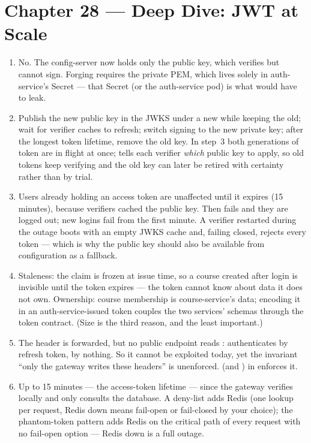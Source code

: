 \section*{Chapter 28 --- Deep Dive: JWT at Scale}
\begin{enumerate}
  \item No. The config-server now holds only the public key, which
  verifies but cannot sign. Forging requires the private PEM, which
  lives solely in auth-service's Secret --- that Secret (or the
  auth-service pod) is what would have to leak.
  \item Publish the new public key in the JWKS under a new 
  while keeping the old; wait for verifier caches to refresh; switch
  signing to the new private key; after the longest token lifetime,
  remove the old key. In step~3 both generations of token are in
  flight at once;  tells each verifier \emph{which} public
  key to apply, so old tokens keep verifying and the old key can later
  be retired with certainty rather than by trial.
  \item Users already holding an access token are unaffected until it
  expires (15 minutes), because verifiers cached the public key. Then
   fails and they are logged out; new logins fail from
  the first minute. A verifier restarted during the outage boots with
  an empty JWKS cache and, failing closed, rejects every token ---
  which is why the public key should also be available from
  configuration as a fallback.
  \item Staleness: the claim is frozen at issue time, so a course
  created after login is invisible until the token expires --- the
  token cannot know about data it does not own. Ownership: course
  membership is course-service's data; encoding it in an
  auth-service-issued token couples the two services' schemas through
  the token contract. (Size is the third reason, and the least
  important.)
  \item The header is forwarded, but no public endpoint reads
  :  authenticates by refresh token,
   by nothing. So it cannot be exploited today, yet
  the invariant ``only the gateway writes these headers'' is
  unenforced. 
  (and ) in  enforces it.
  \item Up to 15 minutes --- the access-token lifetime --- since the
  gateway verifies locally and only  consults the
  database. A  deny-list adds Redis (one lookup per request,
  Redis down means fail-open or fail-closed by your choice); the
  phantom-token pattern adds Redis on the critical path of every
  request with no fail-open option --- Redis down is a full outage.
\end{enumerate}

